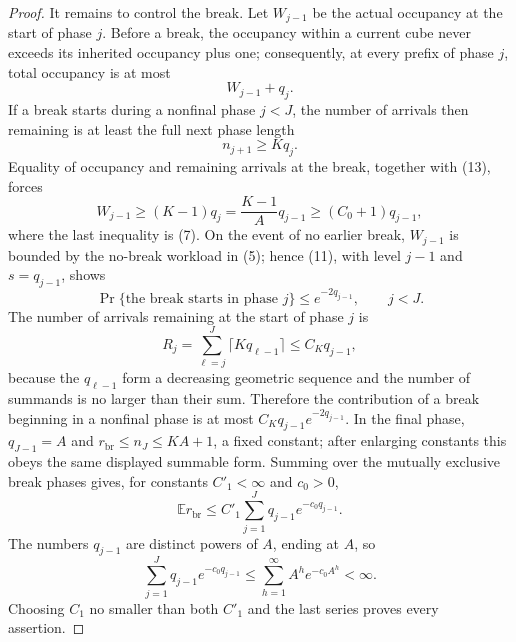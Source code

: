 \documentclass{article}
\begin{document}
\begin{proof}
It remains to control the break.  Let \(W_{j-1}\) be the actual occupancy at the start of phase \(j\).  Before a break, the occupancy within a current cube never exceeds its inherited occupancy plus one; consequently, at every prefix of phase \(j\), total occupancy is at most
\[
 W_{j-1}+q_j. \tag{13}
\]
If a break starts during a nonfinal phase \(j<J\), the number of arrivals then remaining is at least the full next phase length
\[
 n_{j+1}\ge Kq_j.
\]
Equality of occupancy and remaining arrivals at the break, together with (13), forces
\[
 W_{j-1}\ge(K-1)q_j=\frac{K-1}{A}q_{j-1}\ge(C_0+1)q_{j-1}, \tag{14}
\]
where the last inequality is (7).  On the event of no earlier break, \(W_{j-1}\) is bounded by the no-break workload in (5); hence (11), with level \(j-1\) and \(s=q_{j-1}\), shows
\[
 \Pr\{\text{the break starts in phase }j\}\le e^{-2q_{j-1}},
 \qquad j<J. \tag{15}
\]
The number of arrivals remaining at the start of phase \(j\) is
\[
 R_j=\sum_{\ell=j}^J\lceil Kq_{\ell-1}\rceil
 \le C_Kq_{j-1}, \tag{16}
\]
because the \(q_{\ell-1}\) form a decreasing geometric sequence and the number of summands is no larger than their sum.  Therefore the contribution of a break beginning in a nonfinal phase is at most \(C_Kq_{j-1}e^{-2q_{j-1}}\).  In the final phase, \(q_{J-1}=A\) and \(r_{\mathrm{br}}\le n_J\le KA+1\), a fixed constant; after enlarging constants this obeys the same displayed summable form.  Summing over the mutually exclusive break phases gives, for constants \(C'_1<\infty\) and \(c_0>0\),
\[
 \mathbb E r_{\mathrm{br}}
 \le C'_1\sum_{j=1}^Jq_{j-1}e^{-c_0q_{j-1}}.
\]
The numbers \(q_{j-1}\) are distinct powers of \(A\), ending at \(A\), so
\[
 \sum_{j=1}^Jq_{j-1}e^{-c_0q_{j-1}}
 \le \sum_{h=1}^{\infty}A^he^{-c_0A^h}<\infty.
\]
Choosing \(C_1\) no smaller than both \(C'_1\) and the last series proves every assertion.
\end{proof}
\end{document}
